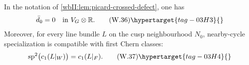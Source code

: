 \begin{lemma}
\hypertarget{tag-03ID}{}\label{wbII:lem:picard-cusp-defect}

In the notation of
\cref{wbII:lem:picard-crossed-defect}, one has
\[
 \bar d_0=0\quad\text{in }V_G\otimes\mathbb R.
\tag{W.36}\hypertarget{tag-03H3}{}\label{wbII:eq:W:5.17n}
\]
Moreover, for every line bundle $L$ on the cusp neighbourhood $N_0$,
nearby-cycle specialization is compatible with first Chern classes:
\[
 \operatorname{sp}^2\bigl(c_1(L|_W)\bigr)=c_1(L|_F).
\tag{W.37}\hypertarget{tag-03H4}{}\label{wbII:eq:W:5.17o}
\]
\end{lemma}



